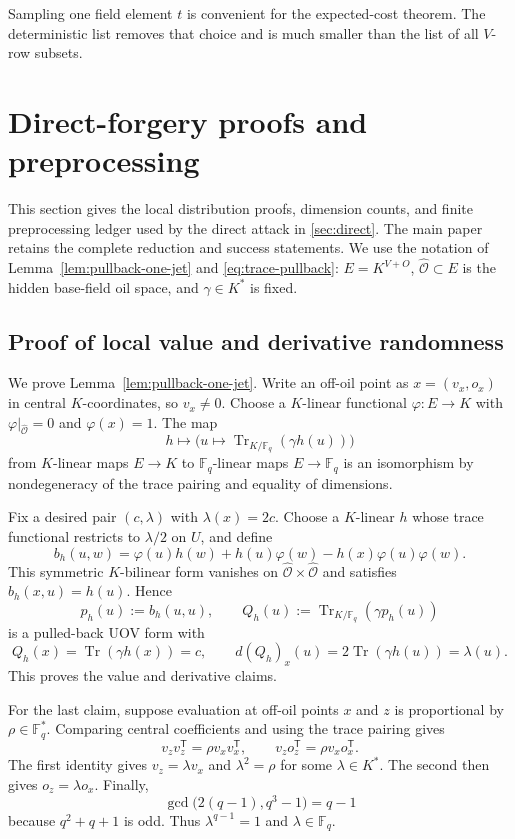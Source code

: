 \documentclass[11pt,a4paper]{article}
\theoremstyle{definition}
\theoremstyle{remark}
\newcommand{\F}{\mathbb F}
\newcommand{\cO}{\mathcal O}
\newcommand{\Tr}{\operatorname{Tr}}
\begin{document}
Sampling one field element $t$ is convenient for the expected-cost theorem.
The deterministic list removes that choice and is much smaller than the list
of all $V$-row subsets.

\section{Direct-forgery proofs and preprocessing}\label{app:direct-proofs}

This section gives the local distribution proofs, dimension counts, and
finite preprocessing ledger used by the direct attack in
\cref{sec:direct}.  The main paper retains the complete reduction and success
statements.  We use the notation of Lemma~\ref{lem:pullback-one-jet} and
\eqref{eq:trace-pullback}: $E=K^{V+O}$, $\widehat{\cO}\subset E$ is the hidden
base-field oil space, and $\gamma\in K^*$ is fixed.

\subsection{Proof of local value and derivative randomness}

We prove Lemma~\ref{lem:pullback-one-jet}.  Write an off-oil point as
$x=(v_x,o_x)$ in central $K$-coordinates, so $v_x\ne0$.  Choose a $K$-linear
functional $\varphi:E\to K$ with
$\varphi|_{\widehat{\cO}}=0$ and $\varphi(x)=1$.  The map
\[
 h\longmapsto\bigl(u\mapsto\Tr_{K/\F_q}(\gamma h(u))\bigr)
\]
from $K$-linear maps $E\to K$ to $\F_q$-linear maps $E\to\F_q$ is an
isomorphism by nondegeneracy of the trace pairing and equality of dimensions.

Fix a desired pair $(c,\lambda)$ with $\lambda(x)=2c$.  Choose a $K$-linear
$h$ whose trace functional restricts to $\lambda/2$ on $U$, and define
\[
 b_h(u,w)
 =\varphi(u)h(w)+h(u)\varphi(w)-h(x)\varphi(u)\varphi(w).
\]
This symmetric $K$-bilinear form vanishes on
$\widehat{\cO}\times\widehat{\cO}$ and satisfies $b_h(x,u)=h(u)$.  Hence
\[
 p_h(u):=b_h(u,u),
 \qquad
 Q_h(u):=\Tr_{K/\F_q}(\gamma p_h(u))
\]
is a pulled-back UOV form with
\[
 Q_h(x)=\Tr(\gamma h(x))=c,
 \qquad
 d(Q_h)_x(u)=2\Tr(\gamma h(u))=\lambda(u).
\]
This proves the value and derivative claims.

For the last claim, suppose evaluation at off-oil points $x$ and $z$ is
proportional by $\rho\in\F_q^*$.  Comparing central coefficients and using the
trace pairing gives
\[
 v_zv_z^{\mathsf T}=\rho v_xv_x^{\mathsf T},
 \qquad
 v_zo_z^{\mathsf T}=\rho v_xo_x^{\mathsf T}.
\]
The first identity gives $v_z=\lambda v_x$ and $\lambda^2=\rho$ for some
$\lambda\in K^*$.  The second then gives $o_z=\lambda o_x$.  Finally,
\[
 \gcd\bigl(2(q-1),q^3-1\bigr)=q-1
\]
because $q^2+q+1$ is odd.  Thus $\lambda^{q-1}=1$ and
$\lambda\in\F_q$.
\end{document}
